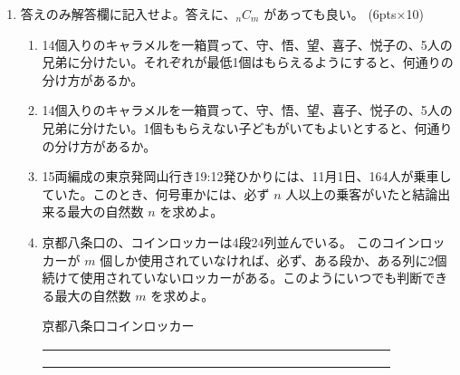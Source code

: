\begin{enumerate}
\medskip
\item 答えのみ解答欄に記入せよ。答えに、${}_nC_m$ があっても良い。	\hfill(6pts$\times$10)
	\begin{enumerate}
	\item 14個入りのキャラメルを一箱買って、守、悟、望、喜子、悦子の、5人の兄弟に分けたい。それぞれが最低1個はもらえるようにすると、何通りの分け方があるか。%
	\item 14個入りのキャラメルを一箱買って、守、悟、望、喜子、悦子の、5人の兄弟に分けたい。1個ももらえない子どもがいてもよいとすると、何通りの分け方があるか。%
	\item 15両編成の東京発岡山行き19:12発ひかりには、11月1日、164人が乗車していた。このとき、何号車かには、必ず $n$ 人以上の乗客がいたと結論出来る最大の自然数 $n$ を求めよ。%
	
	\item 京都八条口の、コインロッカーは4段24列並んでいる。
このコインロッカーが $m$ 個しか使用されていなければ、必ず、ある段か、ある列に2個続けて使用されていないロッカーがある。このようにいつでも判断できる最大の自然数 $m$ を求めよ。%
\smallskip
\begin{center}{\gt 京都八条口コインロッカー}\\
\renewcommand{\arraystretch}{1}
\begin{tabular}{|*{24}{c|}}\hline
& & & & & & & & & & & & & & & & & & & & & & &\\ \hline
& & & & & & & & & & & & & & & & & & & & & & &\\ \hline
& & & & & & & & & & & & & & & & & & & & & & &\\ \hline
& & & & & & & & & & & & & & & & & & & & & & &\\ \hline
\end{tabular}
\end{center}


\end{enumerate}
\end{enumerate}
